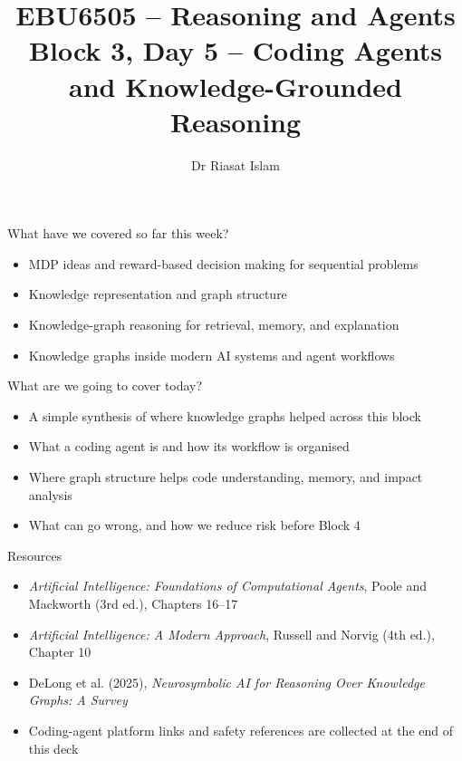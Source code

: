 \documentclass[aspectratio=169]{beamer}
\title[EBU6505 B3 D5]{EBU6505 -- Reasoning and Agents\\Block 3, Day 5 -- Coding Agents and Knowledge-Grounded Reasoning}
\author{Dr Riasat Islam}
\institute{Queen Mary University of London}
\date{}
\newcommand{\defaultdeckrefs}{AIMA4e Ch.10 pp.314--343; Poole3e Ch.16--17 pp.701--766; platform docs listed at end}
\newcommand{\currentsliderefs}{\defaultdeckrefs}
\newcommand{\setslideref}[1]{\gdef\currentsliderefs{#1}}
\begin{document}
\setslideref{AIMA4e Ch.10 pp.314--343; Poole3e Ch.16--17 pp.701--766; platform docs listed at end}
\begin{frame}
  \titlepage
\end{frame}

\begin{frame}{What have we covered so far this week?}
\begin{itemize}
  \item MDP ideas and reward-based decision making for sequential problems
  \item Knowledge representation and graph structure
  \item Knowledge-graph reasoning for retrieval, memory, and explanation
  \item Knowledge graphs inside modern AI systems and agent workflows
\end{itemize}
\end{frame}

\begin{frame}{What are we going to cover today?}
\begin{itemize}
  \item A simple synthesis of where knowledge graphs helped across this block
  \item What a coding agent is and how its workflow is organised
  \item Where graph structure helps code understanding, memory, and impact analysis
  \item What can go wrong, and how we reduce risk before Block 4
\end{itemize}
\end{frame}

\setslideref{AIMA4e Ch.10 pp.314--343; Poole3e Ch.16--17 pp.701--766; review and system links listed later}
\begin{frame}{Resources}
\begin{itemize}
  \item \textit{Artificial Intelligence: Foundations of Computational Agents}, Poole and Mackworth (3rd ed.), Chapters 16--17
  \item \textit{Artificial Intelligence: A Modern Approach}, Russell and Norvig (4th ed.), Chapter 10
  \item DeLong et al. (2025), \textit{Neurosymbolic AI for Reasoning Over Knowledge Graphs: A Survey}
  \item Coding-agent platform links and safety references are collected at the end of this deck
\end{itemize}
\end{frame}
\end{document}
